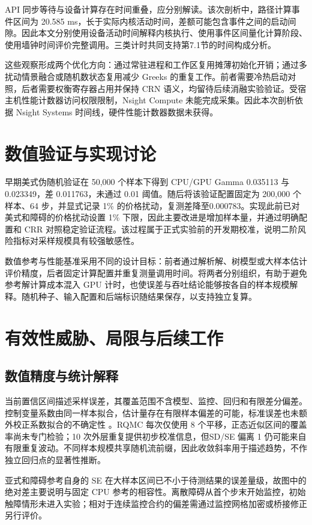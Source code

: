 \documentclass[UTF8,a4paper,zihao=5,fontset=none]{ctexart}
\begin{document}
API 同步等待与设备计算存在时间重叠，应分别解读。该次剖析中，路径计算事件区间为 20.585 ms，长于实际内核活动时间，差额可能包含事件之间的启动间隙。因此本文分别使用设备活动时间解释内核执行、使用事件区间量化计算阶段、使用墙钟时间评价完整调用。三类计时共同支持第7.1节的时间构成分析。


这些观察形成两个优化方向：通过常驻进程和工作区复用摊薄初始化开销；通过多扰动情景融合或随机数状态复用减少 Greeks 的重复工作。前者需要冷热启动对照，后者需要权衡寄存器占用并保持 CRN 语义，均留待后续消融实验验证。受宿主机性能计数器访问权限限制，Nsight Compute 未能完成采集。因此本次剖析依据 Nsight Systems 时间线，硬件性能计数器数据未获得。


\section{数值验证与实现讨论}

早期美式伪随机验证在 50,000 个样本下得到 CPU/GPU Gamma 0.035113 与 0.023349，差 0.011763，未通过 0.01 阈值。随后将该验证配置固定为 200,000 个样本、64 步，并显式记录 1\% 的价格扰动，复测差降至0.000783。实现此前已对美式和障碍的价格扰动设置 1\% 下限，因此主要改进是增加样本量，并通过明确配置和 CRR 对照稳定验证流程。该过程属于正式实验前的开发期校准，说明二阶风险指标对采样规模具有较强敏感性。


数值参考与性能基准采用不同的设计目标：前者通过解析解、树模型或大样本估计评价精度，后者固定计算配置并重复测量调用时间。将两者分别组织，有助于避免参考解计算成本混入 GPU 计时，也使误差与吞吐结论能够按各自的样本规模解释。随机种子、输入配置和后端标识随结果保存，以支持独立复算。


\section{有效性威胁、局限与后续工作}

\subsection{数值精度与统计解释}

当前置信区间描述采样误差，其覆盖范围不含模型、监控、回归和有限差分偏差。控制变量系数由同一样本拟合，估计量存在有限样本偏差的可能，标准误差也未额外校正系数拟合的不确定性 \cite{r12}。RQMC 每次仅使用 8 个平移，正态近似区间的覆盖率尚未专门检验；10 次外层重复提供初步校准信息，但SD/SE 偏离 1 仍可能来自有限重复波动。不同样本规模共享随机流前缀，因此收敛斜率用于描述趋势，不作独立回归点的显著性推断。


亚式和障碍参考自身的 SE 在大样本区间已不小于待测结果的误差量级，故图中的绝对差主要说明与固定 CPU 参考的相容性。离散障碍从首个步末开始监控，初始触障情形未进入实验；相对于连续监控合约的偏差需通过监控网格加密或桥接修正另行评价。
\end{document}
